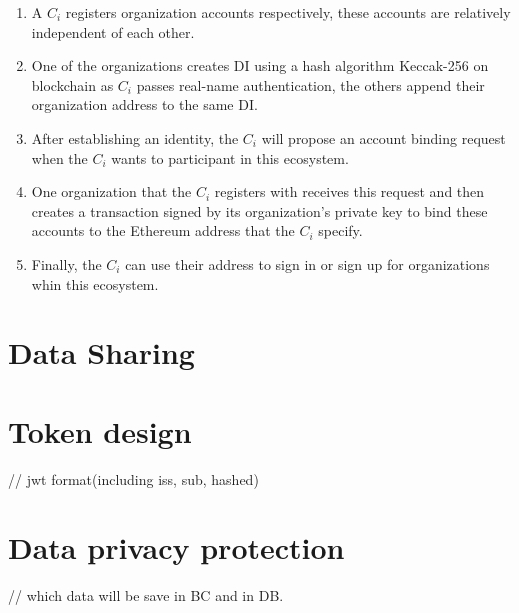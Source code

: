 \begin{enumerate}[noitemsep]
    \item A \(C_i\) registers organization accounts respectively, these accounts are relatively independent of each other.
    \item One of the organizations creates DI using a hash algorithm Keccak-256  on blockchain as \(C_i\) passes real-name authentication, the others append their organization address to the same DI.
    \item After establishing an identity, the \(C_i\) will propose an account binding request when the \(C_i\) wants to participant in this ecosystem.
    \item One organization that the \(C_i\) registers with receives this request and then creates a transaction signed by its organization's private key to bind these accounts to the Ethereum address that the \(C_i\) specify. 
    \item Finally, the \(C_i\) can use their address to sign in or sign up for organizations whin this ecosystem.
\end{enumerate}


\section{Data Sharing}
\section{Token design}
// jwt format(including iss, sub, hashed)
\section{Data privacy protection}
// which data will be save in BC and in DB.